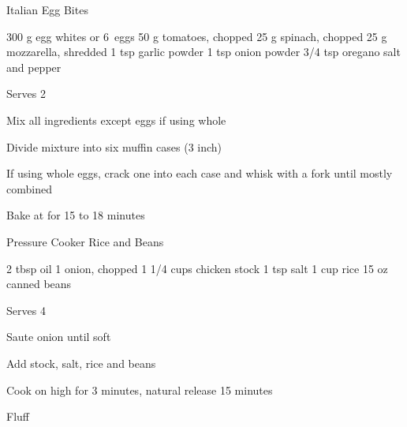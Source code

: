 \begin{denserecipe}{Italian Egg Bites}{}
\begin{ingredients}
300 g egg whites or 6~eggs
50 g tomatoes, chopped
25 g spinach, chopped
25 g mozzarella, \mbox{shredded}
1 tsp garlic powder
1 tsp onion powder
3/4 tsp oregano
salt and pepper
\end{ingredients}
\nextcolumn
Serves 2
\begin{steps}
\item Mix all ingredients except eggs if using whole
\item Divide mixture into six muffin cases (3 inch)
\item If using whole eggs, crack one into each case and whisk with a fork until mostly combined
\item Bake at  for 15 to 18 minutes
\end{steps}
\end{denserecipe}

\begin{recipe}{Pressure Cooker Rice and Beans}{}
\begin{ingredients}
2 tbsp oil
1 onion, chopped
1 1/4 cups chicken stock
1 tsp salt
1 cup rice
15 oz canned beans
\end{ingredients}
\nextcolumn
Serves 4
\begin{steps}
    \item Saute onion until soft
    \item Add stock, salt, rice and beans
    \item Cook on high for 3 minutes, natural release 15 minutes
    \item Fluff
\end{steps}
\end{recipe}
